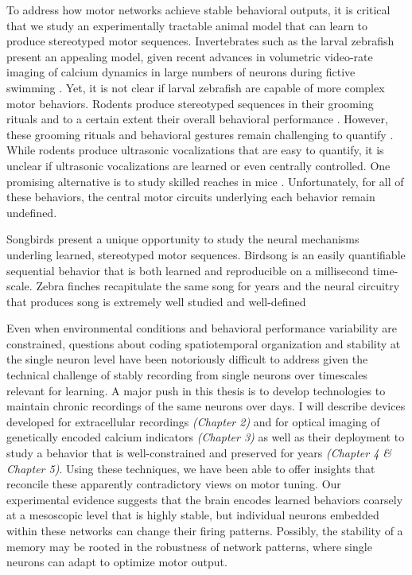 To address how motor networks achieve stable behavioral outputs, it is critical that we study an experimentally tractable animal model that can learn to produce stereotyped motor sequences. Invertebrates such as the larval zebrafish present an appealing model, given recent advances in volumetric video-rate imaging of calcium dynamics in large numbers of neurons during fictive swimming  \cite{Ahrens2012-nu}. Yet, it is not clear if larval zebrafish are capable of more complex motor behaviors. Rodents produce stereotyped sequences in their grooming rituals \cite{Colonnese1996-bi} and to a certain extent their overall behavioral performance \cite{Wiltschko2015-hz}. However, these grooming rituals and behavioral gestures remain challenging to quantify \cite{Wiltschko2015-hz}. While rodents produce ultrasonic vocalizations that are easy to quantify, \cite{Holy2005-jv} it is unclear if ultrasonic vocalizations are learned or even centrally controlled. One promising alternative is to study skilled reaches in mice \cite{Azim2014-te}. Unfortunately, for all of these behaviors, the central motor circuits underlying each behavior remain undefined. 
 
Songbirds present a unique opportunity to study the neural mechanisms underling learned, stereotyped motor sequences. Birdsong is an easily quantifiable sequential behavior that is both learned and reproducible on a millisecond time-scale. Zebra finches recapitulate the same song for years \cite{Lombardino2000-cb}  and the neural circuitry that produces song is extremely well studied and well-defined \cite{Nottebohm1976-hv} \cite{Nottebohm1976-bq}

Even when environmental conditions and behavioral performance variability are constrained, questions about coding spatiotemporal organization and stability at the single neuron level have been notoriously difficult to address given the technical challenge of stably recording from single neurons over timescales relevant for learning. A major push in this thesis is to develop technologies to maintain chronic recordings of the same neurons over days.  I will describe devices developed for extracellular recordings \emph{(Chapter 2)} and for  optical imaging of genetically encoded calcium indicators \emph{(Chapter 3)} as well as their deployment to study a  behavior that is well-constrained and preserved for years \emph{(Chapter 4 \& Chapter 5)}. Using these techniques, we have been able to offer insights that reconcile these apparently contradictory views on motor tuning. Our experimental evidence suggests that the brain encodes learned behaviors coarsely at a mesoscopic level that is highly stable, but individual neurons embedded within these networks can change their firing patterns. Possibly, the stability of a memory may be rooted in the robustness of network patterns, where single neurons can adapt to optimize motor output. 



